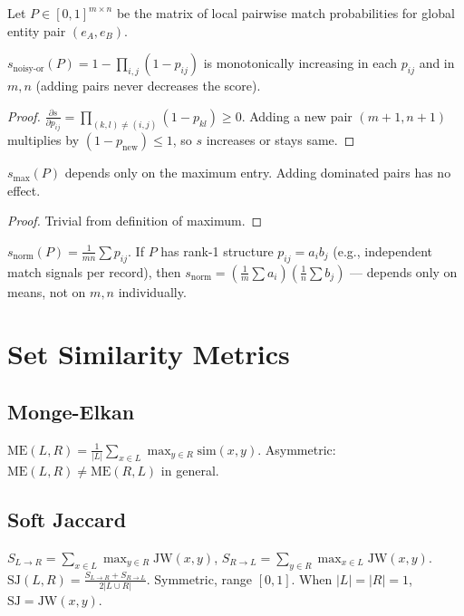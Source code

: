 Let $P \in [0,1]^{m \times n}$ be the matrix of local pairwise match probabilities for global entity pair $(e_A, e_B)$.

\begin{theorem}
	$s_{\text{noisy-or}}(P) = 1 - \prod_{i,j} (1 - p_{ij})$ is monotonically increasing in each $p_{ij}$ and in $m,n$ (adding pairs never decreases the score).
\end{theorem}
\begin{proof}
	$\frac{\partial s}{\partial p_{ij}} = \prod_{(k,l) \neq (i,j)} (1 - p_{kl}) \ge 0$.
	Adding a new pair $(m+1, n+1)$ multiplies by $(1 - p_{\text{new}}) \le 1$, so $s$ increases or stays same.
\end{proof}

\begin{theorem}
	$s_{\text{max}}(P)$ depends only on the maximum entry. Adding dominated pairs has no effect.
\end{theorem}
\begin{proof}
	Trivial from definition of maximum.
\end{proof}

\begin{theorem}
	$s_{\text{norm}}(P) = \frac{1}{mn} \sum p_{ij}$.
	If $P$ has rank-1 structure $p_{ij} = a_i b_j$ (e.g., independent match signals per record), then
	$s_{\text{norm}} = (\frac{1}{m} \sum a_i)(\frac{1}{n} \sum b_j)$ — depends only on means, not on $m,n$ individually.
\end{theorem}

\section{Set Similarity Metrics}
\label{annex:set_metrics}

\subsection{Monge-Elkan}
$\text{ME}(L,R) = \frac{1}{|L|} \sum_{x \in L} \max_{y \in R} \text{sim}(x,y)$.
Asymmetric: $\text{ME}(L,R) \neq \text{ME}(R,L)$ in general.

\subsection{Soft Jaccard}
$S_{L\to R} = \sum_{x \in L} \max_{y \in R} \text{JW}(x,y)$,
$S_{R\to L} = \sum_{y \in R} \max_{x \in L} \text{JW}(x,y)$.
$\text{SJ}(L,R) = \frac{S_{L\to R} + S_{R\to L}}{2 |L \cup R|}$.
Symmetric, range $[0,1]$.
When $|L|=|R|=1$, $\text{SJ} = \text{JW}(x,y)$.

